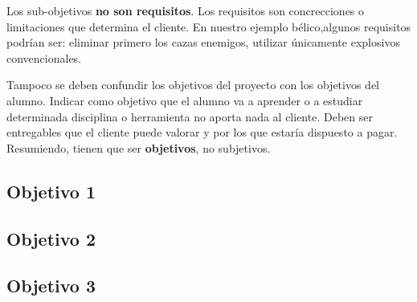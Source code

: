 Los sub-objetivos \textbf{no son requisitos}. Los requisitos son concrecciones o
limitaciones que determina el cliente. En nuestro ejemplo bélico,algunos
requisitos podrían ser: eliminar primero los cazas enemigos, utilizar únicamente
explosivos convencionales.

Tampoco se deben confundir los objetivos del proyecto con los objetivos del
alumno. Indicar como objetivo que el alumno va a aprender o a estudiar
determinada disciplina o herramienta no aporta nada al cliente. Deben ser
entregables que el cliente puede valorar y por los que estaría dispuesto a
pagar. Resumiendo, tienen que ser \textbf{objetivos}, no subjetivos.

\subsection{Objetivo 1}

\subsection{Objetivo 2}

\subsection{Objetivo 3}


